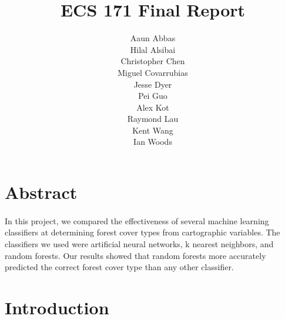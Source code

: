 \documentclass[11pt]{article}
\begin{document}
\begin{titlepage}
\title{\Huge ECS 171 Final Report}
\author{\huge Aaun Abbas\\\huge Hilal Alsibai\\\huge Christopher Chen\\\huge Miguel Covarrubias\\\huge Jesse Dyer\\\huge Pei Guo\\\huge Alex Kot\\\huge Raymond Lau\\\huge Kent Wang\\\huge Ian Woods}
\maketitle
\end{titlepage}

\section{Abstract}
\paragraph{}
In this project, we compared the effectiveness of several machine learning classifiers at determining forest cover types from cartographic variables. The classifiers we used were artificial neural networks, k nearest neighbors, and random forests. Our results showed that random forests more accurately predicted the correct forest cover type than any other classifier. 
\section{Introduction}
\end{document}
